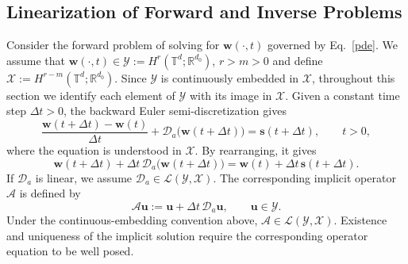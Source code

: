 \documentclass[preprint,numbers,sort&compress]{elsarticle}
\begin{document}
		\subsection{Linearization of Forward and Inverse Problems}\label{sec:linearization}
		Consider the forward problem of solving for $\boldsymbol w(\cdot,t)$ governed by Eq.~\eqref{pde}. We assume that $\boldsymbol w(\cdot,t)\in \mathcal Y:=H^r(\mathbb T^d;\mathbb R^{d_{0}})$, $r>m>0$ and define $\mathcal X:=H^{r-m}(\mathbb T^d;\mathbb R^{d_{0}})$. Since $\mathcal Y$ is continuously embedded in $\mathcal X$, throughout this section we identify each element of $\mathcal Y$ with its image in $\mathcal X$. Given a constant time step $\Delta t>0$, the backward Euler semi-discretization gives
		\[
		\frac{
			\boldsymbol w(t+\Delta t)-\boldsymbol w(t)
		}{\Delta t}
		+
		\mathcal D_a\bigl(\boldsymbol w(t+\Delta t)\bigr)
		=
		\boldsymbol s(t+\Delta t),
		\qquad t>0,
		\]
		where the equation is understood in $\mathcal X$. By rearranging, it gives
		\begin{equation}
			\label{eq:implicit_step}
			\boldsymbol w(t+\Delta t)
			+
			\Delta t\,
			\mathcal D_a\bigl(\boldsymbol w(t+\Delta t)\bigr)
			=
			\boldsymbol w(t)
			+
			\Delta t\,\boldsymbol s(t+\Delta t).
		\end{equation}
		If $\mathcal D_a$ is linear, we assume $\mathcal D_a\in\mathcal L(\mathcal Y,\mathcal X)$. The corresponding implicit operator $\mathcal{A}$ is defined by
		\[
		\mathcal A\boldsymbol u
		:=
		\boldsymbol u+\Delta t\,\mathcal D_a\boldsymbol u,
		\qquad
		\boldsymbol u\in\mathcal Y.
		\]
		Under the continuous-embedding convention above, $\mathcal A\in\mathcal L(\mathcal Y,\mathcal X)$. Existence and uniqueness of the implicit solution require the corresponding operator equation to be well posed.
		
\end{document}
